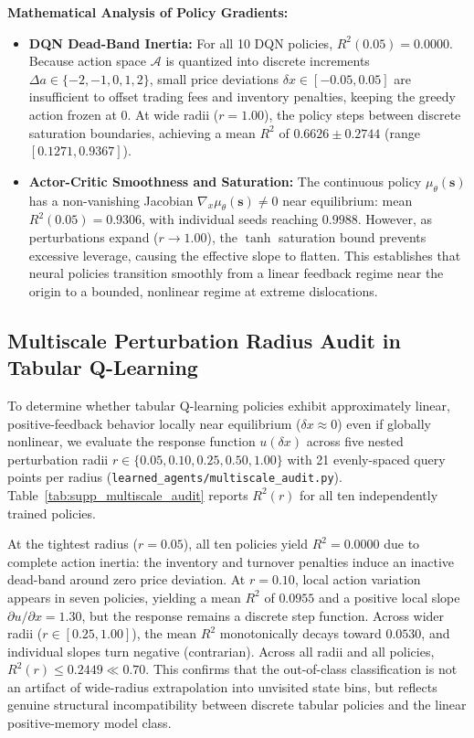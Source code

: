 \documentclass[11pt,a4paper]{article}
\theoremstyle{definition}\newtheorem{definition}[theorem]{Definition}
\theoremstyle{remark}\newtheorem{remark}[theorem]{Remark}
\begin{document}
\textbf{Mathematical Analysis of Policy Gradients:}
\begin{itemize}
    \item \textbf{DQN Dead-Band Inertia:} For all 10 DQN policies, $R^2(0.05) = 0.0000$. Because action space $\mathcal{A}$ is quantized into discrete increments $\Delta a \in \{-2, -1, 0, 1, 2\}$, small price deviations $\delta x \in [-0.05, 0.05]$ are insufficient to offset trading fees and inventory penalties, keeping the greedy action frozen at 0. At wide radii ($r=1.00$), the policy steps between discrete saturation boundaries, achieving a mean $R^2$ of $0.6626 \pm 0.2744$ (range $[0.1271, 0.9367]$).
    \item \textbf{Actor-Critic Smoothness and Saturation:} The continuous policy $\mu_\theta(\mathbf{s})$ has a non-vanishing Jacobian $\nabla_x \mu_\theta(\mathbf{s}) \ne 0$ near equilibrium: mean $R^2(0.05) = 0.9306$, with individual seeds reaching $0.9988$. However, as perturbations expand ($r \to 1.00$), the $\tanh$ saturation bound prevents excessive leverage, causing the effective slope to flatten. This establishes that neural policies transition smoothly from a linear feedback regime near the origin to a bounded, nonlinear regime at extreme dislocations.
\end{itemize}

\subsection{Multiscale Perturbation Radius Audit in Tabular Q-Learning}
\label{sec:supp_multiscale_audit}
To determine whether tabular Q-learning policies exhibit approximately linear, positive-feedback behavior locally near equilibrium ($\delta x \approx 0$) even if globally nonlinear, we evaluate the response function $u(\delta x)$ across five nested perturbation radii $r \in \{0.05, 0.10, 0.25, 0.50, 1.00\}$ with 21 evenly-spaced query points per radius (\nolinkurl{learned_agents/multiscale_audit.py}). Table~\ref{tab:supp_multiscale_audit} reports $R^2(r)$ for all ten independently trained policies.

At the tightest radius ($r = 0.05$), all ten policies yield $R^2 = 0.0000$ due to complete action inertia: the inventory and turnover penalties induce an inactive dead-band around zero price deviation. At $r = 0.10$, local action variation appears in seven policies, yielding a mean $R^2$ of $0.0955$ and a positive local slope $\partial u/\partial x = 1.30$, but the response remains a discrete step function. Across wider radii ($r \in [0.25, 1.00]$), the mean $R^2$ monotonically decays toward $0.0530$, and individual slopes turn negative (contrarian). Across all radii and all policies, $R^2(r) \le 0.2449 \ll 0.70$. This confirms that the out-of-class classification is not an artifact of wide-radius extrapolation into unvisited state bins, but reflects genuine structural incompatibility between discrete tabular policies and the linear positive-memory model class.
\end{document}
